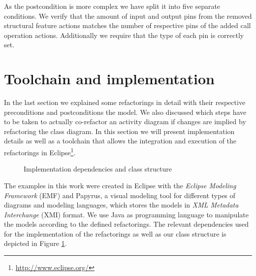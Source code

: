 \documentclass{llncs}
\begin{document}
As the postcondition is more complex we have split it into five separate conditions. We verify that the amount of input and output 
pins from the removed structural feature actions matches the number of respective pins of the added call operation actions. Additionally
we require that the type of each pin is correctly set.


\clearpage
\section{Toolchain and implementation}
\label{sec:toolchain}
In the last section we explained some refactorings in detail with their respective preconditions and postconditions the model. 
We also discussed which steps have to be taken to actually co-refactor an activity diagram if changes are implied by refactoring 
the class diagram. In this section we will present implementation details as well as a toolchain that allows the integration and 
execution of the refactorings in Eclipse\footnote{\url{http://www.eclipse.org/}}.

\begin{figure}
 \caption{Implementation dependencies and class structure}
 \label{fig:toolchain}
\end{figure}

The examples in this work were created in Eclipse with the \textit{Eclipse Modeling Framework} \cite{Steinberg:2009:EEM:1197540} 
(EMF) and Papyrus, a visual modeling tool for different types of diagrams and modeling languages, which stores the models 
in \textit{XML Metadata Interchange} \cite{man:XMI} (XMI) format. We use Java as programming language to manipulate 
the models according to the defined refactorings. The relevant dependencies used for the implementation of the refactorings 
as well as our class structure is depicted in Figure \ref{fig:toolchain}.
\end{document}
